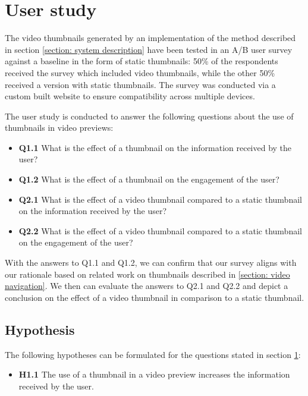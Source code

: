 \documentclass{../resources/sig-alternate-05-2015}
\begin{document}
\section{User study}
\label{section: user study}

The video thumbnails generated by an implementation of the method described in section \ref{section: system description} have been tested in an A/B user survey against a baseline in the form of static thumbnails: 50\% of the respondents received the survey which included video thumbnails, while the other 50\% received a version with static thumbnails. The survey was conducted via a custom built website to ensure compatibility across multiple devices.

The user study is conducted to answer the following questions about the use of thumbnails in video previews:

\begin{itemize}
	\item \textbf{Q1.1} What is the effect of a thumbnail on the information received by the user?
	\item \textbf{Q1.2} What is the effect of a thumbnail on the engagement of the user?
	\item \textbf{Q2.1} What is the effect of a video thumbnail compared to a static thumbnail on the information received by the user?
	\item \textbf{Q2.2} What is the effect of a video thumbnail compared to a static thumbnail on the engagement of the user?
\end{itemize}

With the answers to Q1.1 and Q1.2, we can confirm that our survey aligns with our rationale based on related work on thumbnails described in \ref{section: video navigation}. We then can evaluate the answers to Q2.1 and Q2.2 and depict a conclusion on the effect of a video thumbnail in comparison to a static thumbnail.

\subsection{Hypothesis}

The following hypotheses can be formulated for the questions stated in section \ref{section: user study}:

\begin{itemize}
	\item \textbf{H1.1} The use of a thumbnail in a video preview increases the information received by the user.
\end{itemize}
\end{document}
